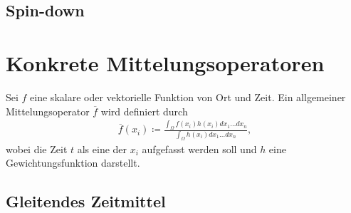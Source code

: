 \documentclass{book}
\newcommand\newoverline[1]{%
\overline{#1}}
\begin{document}
\subsection{Spin-down}
\label{sec:spin-down}

\section{Konkrete Mittelungsoperatoren}
\label{sec:konkrete_mittelungsoperatoren}

Sei $f$ eine skalare oder vektorielle Funktion von Ort und Zeit. Ein allgemeiner Mittelungsoperator $\newoverline{f}$ wird definiert durch
%
\begin{eqnarray}
\newoverline{f}\left(x_i\right) \coloneqq \frac{\int_\Omega f\left(x_i\right)h\left(x_i\right)dx_1\dotsc dx_n}{\int_\Omega h\left(x_i\right)dx_1\dotsc dx_n}, \label{eq:av_op_gen}
\end{eqnarray}
%
wobei die Zeit $t$ als eine der $x_i$ aufgefasst werden soll und $h$ eine Gewichtungsfunktion darstellt.

\subsection{Gleitendes Zeitmittel}
\label{sec:gleitendes_zeitmittel}
\end{document}
